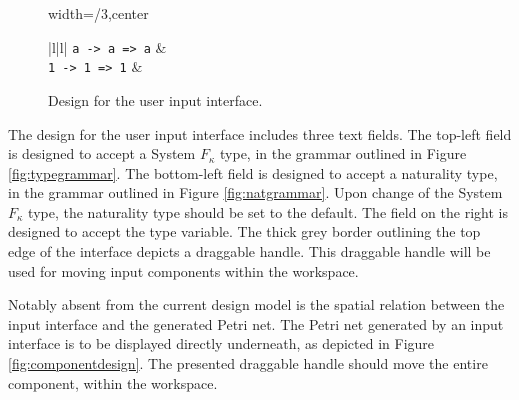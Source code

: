 \documentclass[../Dissertation.tex]{subfiles}
\begin{document}
\begin{figure}[H]
\begin{adjustbox}{width=\columnwidth/3,center}
\centering
\begin{tabu}{|l|l|}
\lstinline{a -> a => a} &  \\ 
\lstinline{1 -> 1 => 1} &  \\ \hline
\end{tabu}
\end{adjustbox}
\caption{Design for the user input interface.}
\label{fig:inputdesign}
\end{figure}
The design for the user input interface includes three text fields. The top-left  field is designed to accept a System $F_\kappa$ type, in the grammar outlined in Figure \ref{fig:typegrammar}. The bottom-left field is designed to accept a naturality type, in the grammar outlined in Figure \ref{fig:natgrammar}. Upon change of the System $F_\kappa$ type, the naturality type should be set to the default. The field on the right is designed to accept the type variable. The thick grey border outlining the top edge of the interface depicts a draggable handle. This draggable handle will be used for moving input components within the workspace.
\par
Notably absent from the current design model is the spatial relation between the input interface and the generated Petri net. The Petri net generated by an input interface is to be displayed directly underneath, as depicted in Figure \ref{fig:componentdesign}. The presented draggable handle should move the entire component, within the workspace.
\end{document}
